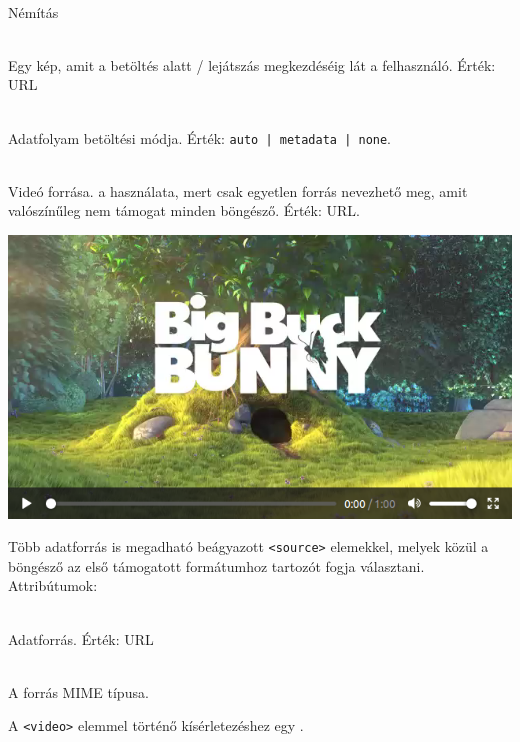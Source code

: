 \begin{frame}
  \begin{description}[m]
    \item[\texttt{muted}] \hfill \\ Némítás
    \item[\texttt{poster}] \hfill \\ Egy kép, amit a betöltés 
    alatt / lejátszás megkezdéséig lát a felhasználó. Érték: URL
    \item[\texttt{preload}] \hfill \\ Adatfolyam betöltési módja. 
    Érték: \texttt{auto | metadata | none}.
    \item[\texttt{src}] \hfill \\ Videó forrása.  a használata, mert csak egyetlen forrás nevezhető meg, 
    amit valószínűleg nem támogat minden böngésző. Érték: URL.
  \end{description}
\end{frame}

\begin{frame}
  \begin{exampleblock}{}
    \footnotesize
    
  \end{exampleblock}
    \begin{center}
    \includegraphics[scale=.2]{video1.png}
  \end{center}
\end{frame}

\begin{frame}
  Több adatforrás is megadható beágyazott \texttt{<source>} elemekkel, melyek 
  közül a böngésző az első támogatott formátumhoz tartozót 
  fogja választani. Attribútumok:
  \begin{description}[m]
    \item[\texttt{src}] \hfill \\ Adatforrás. Érték: URL
    \item[\texttt{type}] \hfill \\ A forrás MIME típusa.
  \end{description}
  A \texttt{<video>} elemmel történő kísérletezéshez egy 
  .
\end{frame}

